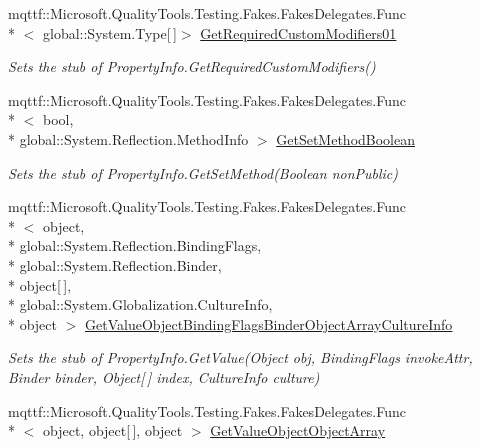 \begin{DoxyCompactItemize}
mqttf\-::\-Microsoft.\-Quality\-Tools.\-Testing.\-Fakes.\-Fakes\-Delegates.\-Func\\*
$<$ global\-::\-System.\-Type\mbox{[}$\,$\mbox{]}$>$ \hyperlink{class_system_1_1_reflection_1_1_fakes_1_1_stub_property_info_aff3415a3fedffbdee750efa7994b7b90}{Get\-Required\-Custom\-Modifiers01}
\begin{DoxyCompactList}\small\item\em Sets the stub of Property\-Info.\-Get\-Required\-Custom\-Modifiers()\end{DoxyCompactList}\item 
mqttf\-::\-Microsoft.\-Quality\-Tools.\-Testing.\-Fakes.\-Fakes\-Delegates.\-Func\\*
$<$ bool, \\*
global\-::\-System.\-Reflection.\-Method\-Info $>$ \hyperlink{class_system_1_1_reflection_1_1_fakes_1_1_stub_property_info_a10f7884f5c6150f954d91302de2f491a}{Get\-Set\-Method\-Boolean}
\begin{DoxyCompactList}\small\item\em Sets the stub of Property\-Info.\-Get\-Set\-Method(\-Boolean non\-Public)\end{DoxyCompactList}\item 
mqttf\-::\-Microsoft.\-Quality\-Tools.\-Testing.\-Fakes.\-Fakes\-Delegates.\-Func\\*
$<$ object, \\*
global\-::\-System.\-Reflection.\-Binding\-Flags, \\*
global\-::\-System.\-Reflection.\-Binder, \\*
object\mbox{[}$\,$\mbox{]}, \\*
global\-::\-System.\-Globalization.\-Culture\-Info, \\*
object $>$ \hyperlink{class_system_1_1_reflection_1_1_fakes_1_1_stub_property_info_a596b78a40206bb153343033a4b801aff}{Get\-Value\-Object\-Binding\-Flags\-Binder\-Object\-Array\-Culture\-Info}
\begin{DoxyCompactList}\small\item\em Sets the stub of Property\-Info.\-Get\-Value(\-Object obj, Binding\-Flags invoke\-Attr, Binder binder, Object\mbox{[}$\,$\mbox{]} index, Culture\-Info culture)\end{DoxyCompactList}\item 
mqttf\-::\-Microsoft.\-Quality\-Tools.\-Testing.\-Fakes.\-Fakes\-Delegates.\-Func\\*
$<$ object, object\mbox{[}$\,$\mbox{]}, object $>$ \hyperlink{class_system_1_1_reflection_1_1_fakes_1_1_stub_property_info_a063b803178a8134027c2d80d9283db37}{Get\-Value\-Object\-Object\-Array}

\end{DoxyCompactItemize}
